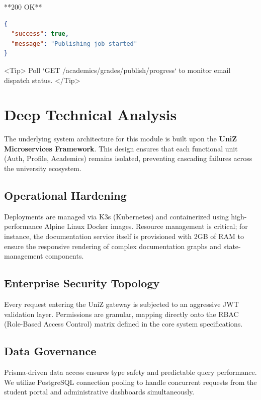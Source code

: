 **200 OK**

\begin{lstlisting}[language=json]
{
  "success": true,
  "message": "Publishing job started"
}

\end{lstlisting}

<Tip>
  Poll `GET /academics/grades/publish/progress` to monitor email dispatch
  status.
</Tip>


\section{Deep Technical Analysis}
The underlying system architecture for this module is built upon the \textbf{UniZ Microservices Framework}. 
This design ensures that each functional unit (Auth, Profile, Academics) remains isolated, preventing cascading failures across the university ecosystem.

\subsection{Operational Hardening}
Deployments are managed via K3s (Kubernetes) and containerized using high-performance Alpine Linux Docker images. 
Resource management is critical; for instance, the documentation service itself is provisioned with 2GB of RAM to ensure the responsive rendering of complex documentation graphs and state-management components.

\subsection{Enterprise Security Topology}
Every request entering the UniZ gateway is subjected to an aggressive JWT validation layer. 
Permissions are granular, mapping directly onto the RBAC (Role-Based Access Control) matrix defined in the core system specifications.

\subsection{Data Governance}
Prisma-driven data access ensures type safety and predictable query performance. 
We utilize PostgreSQL connection pooling to handle concurrent requests from the student portal and administrative dashboards simultaneously.
